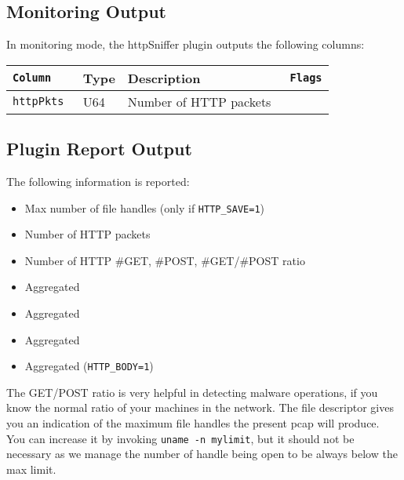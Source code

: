 \documentclass[documentation]{subfiles}
\begin{document}
\subsection{Monitoring Output}
In monitoring mode, the httpSniffer plugin outputs the following columns:
\begin{longtable}{>{\tt}lll>{\tt\small}l}
    \toprule
    {\bf Column} & {\bf Type} & {\bf Description} & {\bf Flags}\\
    \midrule\endhead%
    httpPkts & U64 & Number of HTTP packets & \\
    \bottomrule
\end{longtable}

\subsection{Plugin Report Output}
The following information is reported:
\begin{itemize}
    \item Max number of file handles (only if {\tt HTTP\_SAVE=1})
    \item Number of HTTP packets
    \item Number of HTTP \#GET, \#POST, \#GET/\#POST ratio
    \item Aggregated {\tt{}}
    \item Aggregated {\tt{}}
    \item Aggregated {\tt{}}
    \item Aggregated {\tt{}} ({\tt HTTP\_BODY=1})
\end{itemize}

The GET/POST ratio is very helpful in detecting malware operations, if you know the normal ratio of your
machines in the network. The file descriptor gives you an indication of the maximum file handles the
present pcap will produce. You can increase it by invoking {\tt uname -n mylimit}, but it should not
be necessary as we manage the number of handle being open to be always below the max limit.
\end{document}
